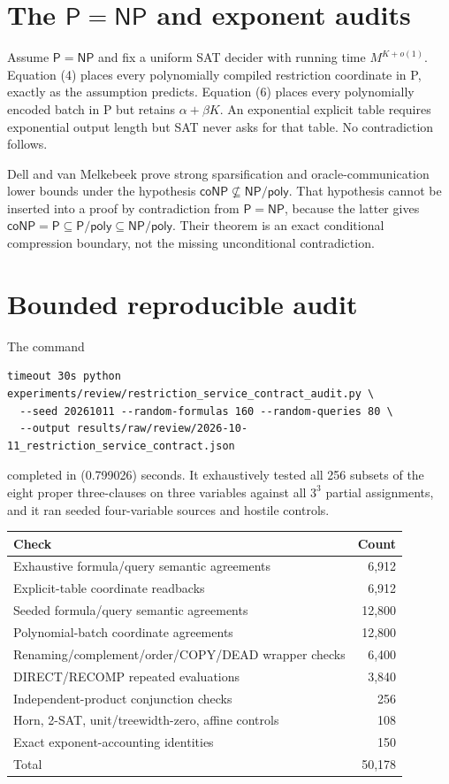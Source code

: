 \documentclass[11pt]{article}
\begin{document}
\section{The $\mathsf P=\mathsf{NP}$ and exponent audits}

Assume $\mathsf P=\mathsf{NP}$ and fix a uniform SAT decider with running
time $M^{K+o(1)}$.  Equation (4) places every polynomially compiled
restriction coordinate in P, exactly as the assumption predicts.  Equation
(6) places every polynomially encoded batch in P but retains
$\alpha+\beta K$.  An exponential explicit table requires exponential
output length but SAT never asks for that table.  No contradiction follows.

Dell and van Melkebeek prove strong sparsification and oracle-communication
lower bounds under the hypothesis $\mathsf{coNP}\not\subseteq\mathsf{NP/poly}$.
That hypothesis cannot be inserted into a proof by contradiction from
$\mathsf P=\mathsf{NP}$, because the latter gives
$\mathsf{coNP}=\mathsf P\subseteq\mathsf{P/poly}\subseteq\mathsf{NP/poly}$.
Their theorem is an exact conditional compression boundary, not the missing
unconditional contradiction.

\section{Bounded reproducible audit}

The command
\begin{verbatim}
timeout 30s python experiments/review/restriction_service_contract_audit.py \
  --seed 20261011 --random-formulas 160 --random-queries 80 \
  --output results/raw/review/2026-10-11_restriction_service_contract.json
\end{verbatim}
completed in (0.799026) seconds.  It exhaustively tested all 256 subsets of
the eight proper three-clauses on three variables against all $3^3$ partial
assignments, and it ran seeded four-variable sources and hostile controls.

\begin{center}
\begin{tabular}{lr}
\toprule
Check & Count\\
\midrule
Exhaustive formula/query semantic agreements & 6,912\\
Explicit-table coordinate readbacks & 6,912\\
Seeded formula/query semantic agreements & 12,800\\
Polynomial-batch coordinate agreements & 12,800\\
Renaming/complement/order/COPY/DEAD wrapper checks & 6,400\\
DIRECT/RECOMP repeated evaluations & 3,840\\
Independent-product conjunction checks & 256\\
Horn, 2-SAT, unit/treewidth-zero, affine controls & 108\\
Exact exponent-accounting identities & 150\\
\midrule
Total & 50,178\\
\bottomrule
\end{tabular}
\end{center}
\end{document}
